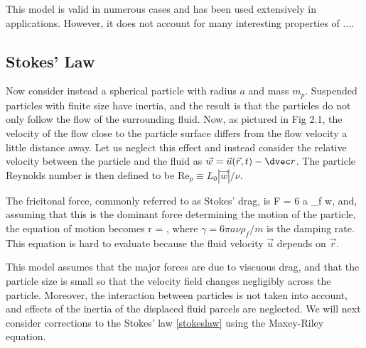 This model is valid in numerous cases and has been used extensively in applications. However, it does not account for many interesting properties of ....


\subsection{Stokes' Law}


Now consider instead a spherical particle with radius $a$ and mass $m_p$. Suspended particles with finite size have inertia, and the result is that the particles do not only follow the flow of the surrounding fluid. Now, as pictured in Fig 2.1, the velocity of the flow close to the particle surface differs from the flow velocity a little distance away. Let us neglect this effect and instead consider the relative velocity between the particle and the fluid as $\vec w = \vec u(\vec r, t) - \dvec r$. The particle Reynolds number is then defined to be Re$_p \equiv L_0 |\vec w| / \nu $. 

The fricitonal force, commonly referred to as Stokes' drag, is
\beq
\vec F = 6 \pi a \nu \rho_f \vec w,
\eeq
and, assuming that this is the dominant force determining the motion of the particle, the equation of motion becomes 
\beq
\ddvec r = ,
\eeq
where $\gamma = 6 \pi a \nu \rho_f/m$ is the damping rate. 
This equation is hard to evaluate because the fluid velocity $\vec u$ depends on $\vec r$. 

This model assumes that the major forces are due to viscuous drag, and that the particle size is small so that the velocity field changes negligibly across the particle. Moreover, the interaction between particles is not taken into account, and effects of the inertia of the displaced fluid parcels are neglected. We will next consider corrections to the Stokes' law \eqref{stokeslaw} using the Maxey-Riley equation.

